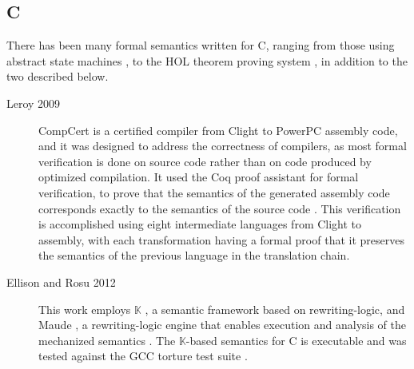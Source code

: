 \documentclass[a4paper,11pt,twoside]{report}
\begin{document}
\subsection{C}\label{sec:chist}
There has been many formal semantics written for C, ranging from those using abstract state machines \cite{Gurevich:1992}, to the HOL theorem proving system \cite{norrish:1998}, in addition to the two described below.
\begin{description}
\item[Leroy 2009] CompCert is a certified compiler from Clight to PowerPC assembly code, and it was designed to address the correctness of compilers, as most formal verification is done on source code rather than on code produced by optimized compilation. It used the Coq proof assistant for formal verification, to prove that the semantics of the generated assembly code corresponds exactly to the semantics of the source code \cite{Leroy-Compcert-CACM}. This verification is accomplished using eight intermediate languages from Clight to assembly, with each transformation having a formal proof that it preserves the semantics of the previous language in the translation chain.

\item[Ellison and Rosu 2012] This work employs $\mathbb{K}$ \cite{rosu-serbanuta-2010-jlap}, a semantic framework based on rewriting-logic, and Maude \cite{Clavel:2007}, a rewriting-logic engine that enables execution and analysis of the mechanized semantics \cite{Ellison:2012}. The $\mathbb{K}$-based semantics for C is executable and was tested against the GCC torture test suite \cite{Ellison:2012}. 
\end{description}
\end{document}
